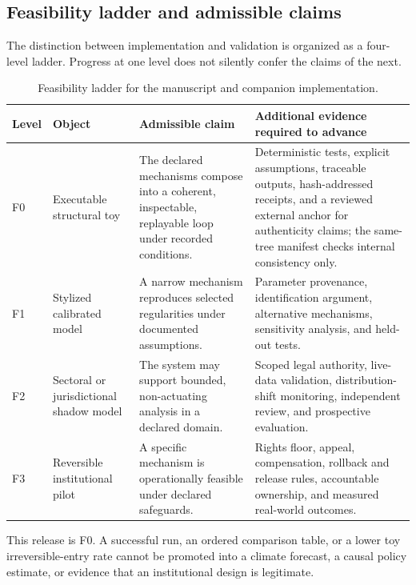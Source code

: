 \documentclass[11pt,a4paper]{article}
\numberwithin{equation}{section}
\theoremstyle{definition}
\theoremstyle{plain}
\theoremstyle{remark}
\begin{document}
\subsection{Feasibility ladder and admissible claims}

The distinction between implementation and validation is organized as a four-level ladder. Progress at one level does not silently confer the claims of the next.

\begin{table}[H]
\centering
\small
\caption{Feasibility ladder for the manuscript and companion implementation.}
\label{tab:feasibility}
\begin{tabularx}{\textwidth}{@{}L{0.08\textwidth}L{0.24\textwidth}Y Y@{}}
\toprule
\textbf{Level} & \textbf{Object} & \textbf{Admissible claim} & \textbf{Additional evidence required to advance} \\
\midrule
F0 & Executable structural toy & The declared mechanisms compose into a coherent, inspectable, replayable loop under recorded conditions. & Deterministic tests, explicit assumptions, traceable outputs, hash-addressed receipts, and a reviewed external anchor for authenticity claims; the same-tree manifest checks internal consistency only. \\
\addlinespace
F1 & Stylized calibrated model & A narrow mechanism reproduces selected regularities under documented assumptions. & Parameter provenance, identification argument, alternative mechanisms, sensitivity analysis, and held-out tests. \\
\addlinespace
F2 & Sectoral or jurisdictional shadow model & The system may support bounded, non-actuating analysis in a declared domain. & Scoped legal authority, live-data validation, distribution-shift monitoring, independent review, and prospective evaluation. \\
\addlinespace
F3 & Reversible institutional pilot & A specific mechanism is operationally feasible under declared safeguards. & Rights floor, appeal, compensation, rollback and release rules, accountable ownership, and measured real-world outcomes. \\
\bottomrule
\end{tabularx}
\end{table}

This release is F0. A successful run, an ordered comparison table, or a lower toy irreversible-entry rate cannot be promoted into a climate forecast, a causal policy estimate, or evidence that an institutional design is legitimate.
\end{document}

